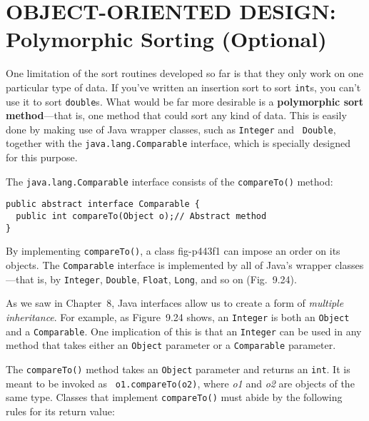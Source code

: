 
\section{OBJECT-ORIENTED DESIGN: \\[2pt]Polymorphic Sorting (Optional)}
\label{objectorienteddesign2pt-polymorphic-sorting-optional}


\noindent One limitation of the sort routines developed so far is that they only
work on one particular type of data. If you've written an insertion
sort to sort {\tt int}s, you can't use it to sort {\tt double}s. What
would be far more desirable is a {\bf polymorphic sort method}---that
is, one method that could sort any kind of data. This is easily done
by making use of Java wrapper classes, such as {\tt Integer} and {\tt
Double}, together with the {\tt java.lang.Comparable} interface, which
is specially designed for this purpose.

The {\tt java.lang.Comparable} interface consists of the
\mbox{\tt compareTo()} method:

\begin{jjjlisting}
\begin{lstlisting}
public abstract interface Comparable {
  public int compareTo(Object o);// Abstract method
}
\end{lstlisting}
\end{jjjlisting}

\noindent By implementing {\tt compareTo()}, a class
{fig-p443f1}
can impose an order on its objects. The {\tt Comparable}
interface is implemented by all of Java's wrapper classes---that is,
by {\tt Integer}, {\tt Double}, {\tt Float}, {\tt Long}, and so on
(Fig.~9.24).

As we saw in Chapter~8, Java interfaces allow us to create a form of
{\em multiple inheritance}. For example, as Figure~9.24 shows, an
{\tt Integer} is both an \mbox{\tt Object} and a {\tt Comparable}. One
implication of this is that an {\tt Integer} can be used in any method
that takes either an {\tt Object} parameter or a {\tt Comparable}
parameter.

The {\tt compareTo()} method takes an {\tt Object} parameter and
returns an {\tt int}. It is meant to be invoked as {\tt
o1.compareTo(o2)}, where {\em o1} and {\em o2} are objects of the same
type. Classes that implement {\tt compareTo()} must abide by the
following rules for its return value:

